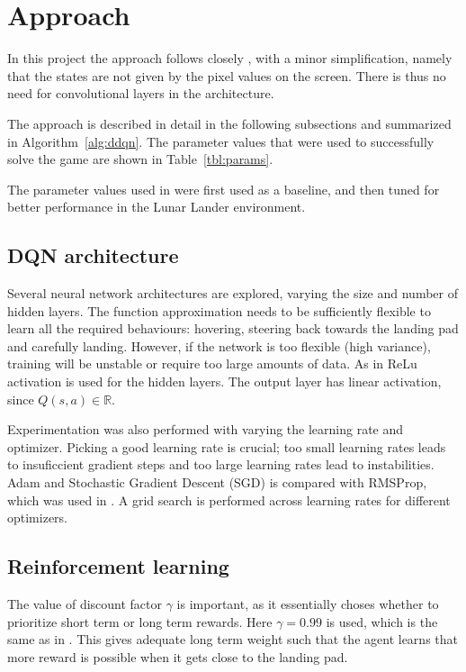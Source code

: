 \documentclass{article}
\begin{document}
\section{Approach}
\label{approach}
In this project the approach follows closely \cite{Mnih2013PlayingAW}, with a minor simplification, namely that the states are not given by the pixel values on the screen. There is thus no need for convolutional layers in the architecture.

The approach is described in detail in the following subsections and summarized in Algorithm~\ref{alg:ddqn}. The parameter values that were used to successfully solve the game are shown in Table~\ref{tbl:params}.

The parameter values used in \cite{mnih2015humanlevel} were first used as a baseline, and then tuned for better performance in the Lunar Lander environment.

\subsection{DQN architecture}
Several neural network architectures are explored, varying the size and number of hidden layers. The function approximation needs to be sufficiently flexible to learn all the required behaviours: hovering, steering back towards the landing pad and carefully landing. However, if the network is too flexible (high variance), training will be unstable or require too large amounts of data. As in \cite{mnih2015humanlevel} ReLu activation is used for the hidden layers. The output layer has linear activation, since $Q(s,a) \in \mathbb{R}$.

Experimentation was also performed with varying the learning rate and optimizer. Picking a good learning rate is crucial; too small learning rates leads to insuficcient gradient steps and too large learning rates lead to instabilities. Adam and Stochastic Gradient Descent (SGD) is compared with RMSProp, which was used in \cite{mnih2015humanlevel}. A grid search is performed across learning rates for different optimizers.

\subsection{Reinforcement learning}

The value of discount factor $\gamma$ is important, as it essentially choses whether to prioritize short term or long term rewards. Here $\gamma = 0.99$ is used, which is the same as in \cite{mnih2015humanlevel}. This gives adequate long term weight such that the agent learns that more reward is possible when it gets close to the landing pad.
\end{document}
